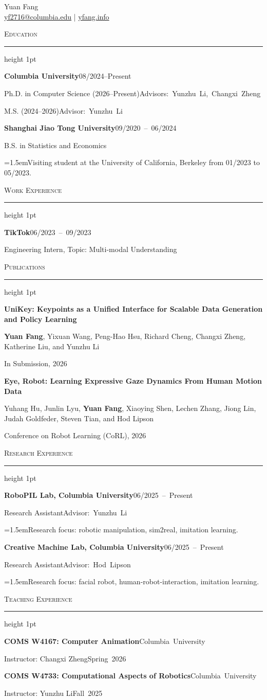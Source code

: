 \documentclass[11pt,letterpaper]{article}
\newcommand{\cvleading}{14pt}
\newcommand{\cventrygap}{\par\addvspace{5pt}}
\newcommand{\cvtitlefont}{\fontsize{12}{\cvleading}\selectfont}
\newcommand{\cvsection}[1]{%
  \par\addvspace{8pt}%
  {\fontsize{13}{16}\selectfont\scshape\color{columbiaprimary}#1}\par\vspace{2pt}%
  {\color{columbiablue}\hrule height 1pt}\vspace{6pt}%
}
\newcommand{\cvrow}[2]{#1\hfill\mbox{#2}\par}
\newcommand{\cvtitle}[2]{{\cvtitlefont\cvrow{\textbf{#1}}{#2}}}
\newcommand{\cvbullet}[1]{%
  {\hangindent=1.5em\hangafter=1\makebox[1.5em][c]{\textbullet}#1\par}%
}
\newcommand{\publicationEntry}[3]{%
  {\raggedright
    {\cvtitlefont\bfseries #1\par}
    #2\par
    #3\par}%
}
\begin{document}
\begin{center}
  {\fontsize{22}{26}\selectfont Yuan Fang} \\[6pt]
  \href{mailto:yf2716@columbia.edu}{yf2716@columbia.edu}
  \enspace|\enspace
  \href{https://yfang.info}{yfang.info}
\end{center}

\fontsize{11}{\cvleading}\selectfont
\cvsection{Education}
\cvtitle{Columbia University}{08/2024--Present}
\cvrow{Ph.D. in Computer Science (2026--Present)}{Advisors: Yunzhu Li, Changxi Zheng}
\cvrow{M.S. (2024--2026)}{Advisor: Yunzhu Li}
\cventrygap
\cvtitle{Shanghai Jiao Tong University}{09/2020 -- 06/2024}
B.S. in Statistics and Economics\par
\cvbullet{Visiting student at the University of California, Berkeley from 01/2023 to 05/2023.}

\cvsection{Work Experience}
\cvtitle{TikTok}{06/2023 -- 09/2023}
Engineering Intern, Topic: Multi-modal Understanding\par

\cvsection{Publications}
\publicationEntry
  {UniKey: Keypoints as a Unified Interface for Scalable Data Generation and Policy Learning}
  {\textbf{Yuan Fang}, Yixuan Wang, Peng-Hao Hsu, Richard Cheng, Changxi Zheng, Katherine Liu, and Yunzhu Li}
  {In Submission, 2026}
\cventrygap
\publicationEntry
  {Eye, Robot: Learning Expressive Gaze Dynamics From Human Motion Data}
  {Yuhang Hu, Junlin Lyu, \textbf{Yuan Fang}, Xiaoying Shen, Lechen Zhang, Jiong Lin, Judah Goldfeder, Steven Tian, and Hod Lipson}
  {Conference on Robot Learning (CoRL), 2026}

\cvsection{Research Experience}
\cvtitle{RoboPIL Lab, Columbia University}{06/2025 -- Present}
\cvrow{Research Assistant}{Advisor: Yunzhu Li}
\cvbullet{Research focus: robotic manipulation, sim2real, imitation learning.}
\cventrygap
\cvtitle{Creative Machine Lab, Columbia University}{06/2025 -- Present}
\cvrow{Research Assistant}{Advisor: Hod Lipson}
\cvbullet{Research focus: facial robot, human-robot-interaction, imitation learning.}

\cvsection{Teaching Experience}
\cvtitle{COMS W4167: Computer Animation}{Columbia University}
\cvrow{Instructor: Changxi Zheng}{Spring 2026}
\cventrygap
\cvtitle{COMS W4733: Computational Aspects of Robotics}{Columbia University}
\cvrow{Instructor: Yunzhu Li}{Fall 2025}
\end{document}
